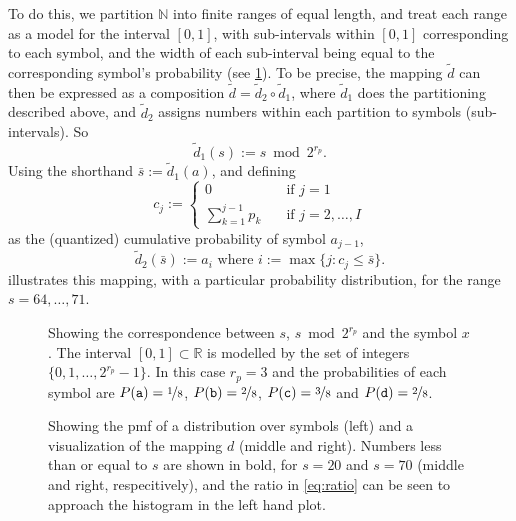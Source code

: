 \documentclass{article}
\theoremstyle{definition}
\begin{document}
To do this, we partition \(\mathbb{N}\) into finite ranges of equal length, and
treat each range as a model for the interval \([0, 1]\), with sub-intervals
within \([0, 1]\) corresponding to each symbol, and the width of each
sub-interval being equal to the corresponding symbol's probability (see
\cref{fig:interval}). To be precise, the mapping \(\tilde d\) can then be
expressed as a composition \(\tilde d = \tilde d_2 \circ \tilde d_1\), where
\(\tilde d_1\) does the partitioning described above, and \(\tilde d_2\)
assigns numbers within each partition to symbols (sub-intervals). So
\begin{equation}
  \tilde d_1(s) := s \bmod 2^{r_p}.
\end{equation}
Using the shorthand \(\bar{s} := \tilde d_1 (a)\), and defining
\begin{equation}
  c_j := \begin{cases}
    0                    &\quad\text{if }j=1\\
    \sum_{k=1}^{j-1} p_k &\quad\text{if }j=2,\ldots,I
  \end{cases}
\end{equation}
as the (quantized) cumulative probability of symbol \(a_{j-1}\),
\begin{equation}
  \tilde d_2(\bar s) := a_i\text{ where }i := \max \{j : c_j \leq \bar s\}.
\end{equation}
 illustrates this mapping, with a particular probability
distribution, for the range \(s = 64,\ldots, 71\).

\begin{figure}[h]
  \centering
  \drawinterval
  \caption{
    Showing the correspondence between \(s\), \(s \bmod 2^{r_p}\) and the
    symbol \(x\). The interval \([0, 1]\subset\mathbb{R}\) is modelled by the
    set of integers \(\{0, 1, \ldots, 2^{r_p} - 1\}\). In this case \(r_p = 3\)
    and the probabilities of each symbol are \(P(\mathtt a) =
    \nicefrac{1}{8}\), \(P(\mathtt b) = \nicefrac{2}{8}\), \(P(\mathtt c) =
    \nicefrac{3}{8}\) and \(P(\mathtt d) = \nicefrac{2}{8}\).}
  \label{fig:interval}
\end{figure}

\begin{figure}[h]
  \centering
  \drawpmf \quad {} \quad {}
  \caption{
    Showing the pmf of a distribution over symbols (left) and a visualization
    of the mapping \(d\) (middle and right).  Numbers less than or equal to
    \(s\) are shown in bold, for \(s=20\) and \(s=70\) (middle and right,
    respecitively), and the ratio in \cref{eq:ratio} can be seen to approach
    the histogram in the left hand plot.
  }\label{fig:visual-ans}
\end{figure}
\end{document}
